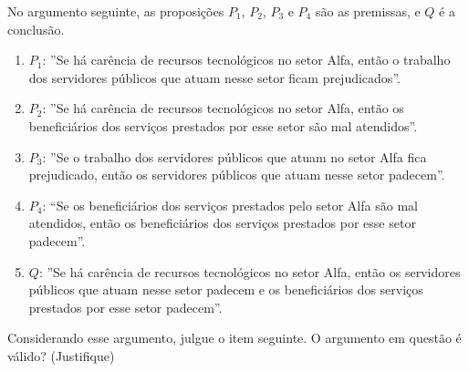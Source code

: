 \item
	No argumento seguinte, as proposições $P_1$, $P_2$, $P_3$ e $P_4$ são as premissas, e $Q$ é a
conclusão.
\begin{enumerate}
	\item $P_1$: ''Se há carência de recursos tecnológicos no setor Alfa, então o trabalho dos servidores públicos que atuam nesse setor ficam prejudicados''.
	\item $P_2$: ''Se há carência de recursos tecnológicos no setor Alfa, então os beneficiários dos serviços prestados por esse setor são mal atendidos''.
	\item $P_3$: ''Se o trabalho dos servidores públicos que atuam no setor Alfa fica prejudicado, então os servidores públicos que atuam nesse setor padecem''.
	\item $P_4$: “Se os beneficiários dos serviços prestados pelo setor Alfa são mal atendidos, então os beneficiários dos serviços prestados por esse setor padecem''.
	\item $Q$: ''Se há carência de recursos tecnológicos no setor Alfa, então os servidores públicos que atuam nesse setor padecem e os beneficiários dos serviços prestados por esse setor padecem''.
\end{enumerate}
Considerando esse argumento, julgue o item seguinte. O argumento em questão é válido? (Justifique)
